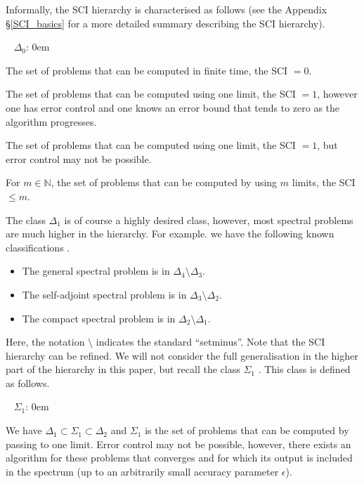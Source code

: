 \documentclass[a4paper,10pt]{article}
\begin{document}
Informally, the SCI hierarchy is characterised as follows (see the Appendix \S \ref{SCI_basics} for a more detailed summary describing the SCI hierarchy).  

\begin{labeling}{\,\,\, $\Delta_0$:}
\itemsep0em
\item[\,\,\, $\Delta_0$:] The set of problems that can be computed in finite time, the SCI $=0$.
\item[\,\,\, $\Delta_1$:] The set of problems that can be computed using one limit, the SCI $=1$, however 
one has error control and one knows an error bound that tends to zero as the algorithm progresses.
\item[\,\,\, $\Delta_2$:] The set of problems that can be computed using one limit, the SCI $=1$, but error control may not be possible. 
\item[\,\,\, $\Delta_{m+1}$:] For $m \in \mathbb{N}$, the set of problems that can be computed by using $m$ limits, the SCI $\leq m$.
\end{labeling}

The class $\Delta_1$ is of course a highly desired class, however, most spectral problems are much higher in the hierarchy. For example. we have the following known classifications \cite{hansen2011,SCI, CRAS}.
\begin{itemize}
\itemsep0em
\item[(i)] The general spectral problem is in $\Delta_4\setminus \Delta_3$.
\item[(ii)] The self-adjoint spectral problem is in $\Delta_3\setminus \Delta_2$.
\item[(iii)] The compact spectral problem is in $\Delta_2\setminus \Delta_1$.
\end{itemize}
Here, the notation $\setminus$ indicates the standard ``setminus''. Note that the SCI hierarchy can be refined. We will not consider the full generalisation in the higher part of the hierarchy in this paper, but recall the class $\Sigma_1$ \cite{colb1}. This class is defined as follows.
\begin{labeling}{\,\,\, $\Sigma_1$:}
\itemsep0em
\item[\,\,\, $\Sigma_1$:] We have $\Delta_1 \subset \Sigma_1 \subset \Delta_2 $ and $\Sigma_1$ is the set of problems that can be computed by passing to one limit. Error control may not be possible, however, there exists an algorithm for these problems that converges and for which its output is included in the spectrum (up to an arbitrarily small accuracy parameter $\epsilon$).
\end{labeling}
\end{document}
